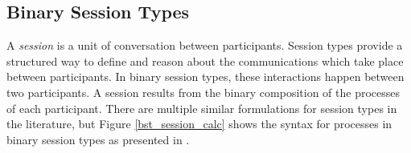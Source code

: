 \documentclass[12pt,twoside]{report}
\newcommand{\comment}[1]{}
\begin{document}

\subsection{Binary Session Types}
A \textit{session} is a unit of conversation between participants. Session types provide a structured way to define and reason about the communications which take place between participants. In binary session types, these interactions happen between two participants. A session results from the binary composition of the processes of each participant. There are multiple similar formulations for session types in the literature, but Figure \ref{bst_session_calc} shows the syntax for processes in binary session types as presented in \cite{co406}. %
\end{document}
